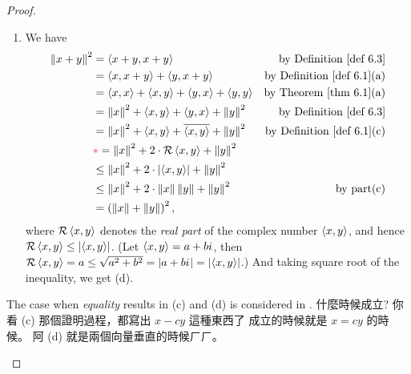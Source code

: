 \begin{proof}
\begin{enumerate}
\item We have
\begin{align*}
    \norm{x + y}^2 & = \LG x + y, x + y \RG & \text{by \DEF{6.3}} \\
        & = \LG x, x + y \RG + \LG y, x + y \RG & \text{by \DEF{6.1}(a)} \\
        & = \LG x, x \RG + \LG x, y \RG + \LG y, x \RG + \LG y, y \RG & \text{by \THM{6.1}(a)} \\
        & = \norm{x}^2 + \LG x, y \RG + \LG y, x \RG + \norm{y}^2 & \text{by \DEF{6.3}} \\
        & = \norm{x}^2 + \LG x, y \RG + \conjugatet{\LG x, y \RG} + \norm{y}^2 & \text{by \DEF{6.1}(c)} \\
        & \RED{*}= \norm{x}^2 + 2 \cdot \mathcal{R}\LG x, y \RG + \norm{y}^2 \\
        & \le \norm{x}^2 + 2 \cdot \left| \LG x, y \RG \right| + \norm{y}^2 \\
        & \le \norm{x}^2 + 2 \cdot \norm{x} \norm{y} + \norm{y}^2 & \text{by part(c)} \\
        & = \left(\norm{x} + \norm{y}\right)^2,
\end{align*}
\RED{*}where \(\mathcal{R}\left< x, y \right>\) denotes the \emph{real part} of the complex number \(\left< x, y \right>\), and hence \(\mathcal{R}\left< x, y \right> \le \left| \left< x, y \right> \right|\).
(Let \(\left< x, y \right> = a + b {i\mkern1mu}\), then \(\mathcal{R}\left< x, y \right> = a \le \sqrt{a^2 + b^2} = \lvert a + b{i\mkern1mu}\rvert = \lvert\left< x, y \right>\rvert\).)
And taking square root of the inequality, we get (d).
\end{enumerate}

\begin{note}
The case when \emph{equality} results in (c) and (d) is considered in .
什麼時候成立?
你看 (c) 那個證明過程，都寫出 \(x - cy\) 這種東西了
成立的時候就是 \(x = cy\) 的時候。
阿 (d) 就是兩個向量垂直的時候ㄏㄏ。
\end{note}
\end{proof}

